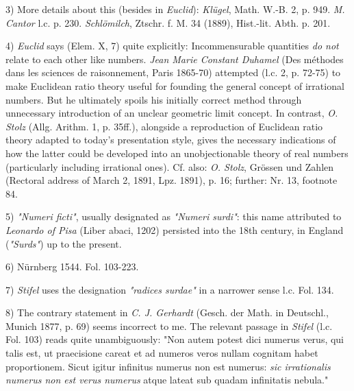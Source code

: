\vfill
\leftline{\rule{2in}{0.4pt}}
\vspace{0.2cm}
{
\footnotesize
3) More details about this (besides in \textit{Euclid}): \textit{Klügel}, Math. W.-B. 2, p. 949. \textit{M. Cantor} l.c. p. 230. \textit{Schlömilch}, Ztschr. f. M. 34 (1889), Hist.-lit. Abth. p. 201.

4) \textit{Euclid} says (Elem. X, 7) quite explicitly: Incommensurable quantities \textit{do not} relate to each other like numbers. \textit{Jean Marie Constant Duhamel} (Des méthodes dans les sciences de raisonnement, Paris 1865-70) attempted (l.c. 2, p. 72-75) to make Euclidean ratio theory useful for founding the general concept of irrational numbers. But he ultimately spoils his initially correct method through unnecessary introduction of an unclear geometric limit concept. In contrast, \textit{O. Stolz} (Allg. Arithm. 1, p. 35ff.), alongside a reproduction of Euclidean ratio theory adapted to today's presentation style, gives the necessary indications of how the latter could be developed into an unobjectionable theory of real numbers (particularly including irrational ones). Cf. also: \textit{O. Stolz}, Grössen und Zahlen (Rectoral address of March 2, 1891, Lpz. 1891), p. 16; further: Nr. 13, footnote 84.

5) \textit{"Numeri ficti"}, usually designated as \textit{"Numeri surdi"}: this name attributed to \textit{Leonardo of Pisa} (Liber abaci, 1202) persisted into the 18th century, in England (\textit{"Surds"}) up to the present.

6) Nürnberg 1544. Fol. 103-223.

7) \textit{Stifel} uses the designation \textit{"radices surdae"} in a narrower sense l.c. Fol. 134.

8) The contrary statement in \textit{C. J. Gerhardt} (Gesch. der Math. in Deutschl., Munich 1877, p. 69) seems incorrect to me. The relevant passage in \textit{Stifel} (l.c. Fol. 103) reads quite unambiguously: "Non autem potest dici numerus verus, qui talis est, ut praecisione careat et ad numeros veros nullam cognitam habet proportionem. Sicut igitur infinitus numerus non est numerus: \textit{sic irrationalis numerus non est verus numerus} atque lateat sub quadam infinitatis nebula."

}
